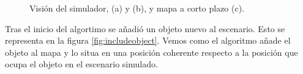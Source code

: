 \begin{figure}[H]
  \begin{center}
  \end{center}
  \caption{Visión del simulador, (a) y (b), y mapa a corto plazo (c).}
  \label{fig:initserver}
\end{figure}

Tras el inicio del algortimo se añadió un objeto nuevo al escenario. Esto se representa en la figura \ref{fig:includeobject}. Vemos como el algoritmo añade el objeto al mapa y lo situa en una posición coherente respecto a la posición que ocupa el objeto en el escenario simulado.


